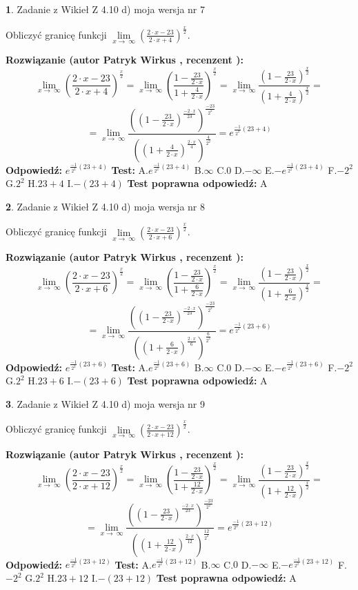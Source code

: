 \documentclass[12pt, a4paper]{article}
\theoremstyle{definition} %
\newtheorem{zad}{}
\newcommand{\zadStart}[1]{\begin{zad}#1\newline}
\newcommand{\zadStop}{\end{zad}}
\newcommand{\rozwStart}[2]{\noindent \textbf{Rozwiązanie (autor #1 , recenzent #2): }\newline}
\newcommand{\rozwStop}{\newline}
\newcommand{\odpStart}{\noindent \textbf{Odpowiedź:}\newline}
\newcommand{\odpStop}{\newline}
\newcommand{\testStart}{\noindent \textbf{Test:}\newline}
\newcommand{\testStop}{\newline}
\newcommand{\kluczStart}{\noindent \textbf{Test poprawna odpowiedź:}\newline}
\newcommand{\kluczStop}{\newline}
\begin{document}
\zadStart{Zadanie z Wikieł Z 4.10 d) moja wersja nr 7}


Obliczyć granicę funkcji  $\lim\limits_{x\to\ \infty}(\frac{2\cdot x-23}{2\cdot x+4})^{\frac{x}{2}}$.
\zadStop
\rozwStart{Patryk Wirkus}{}
$$\lim\limits_{x\to\ \infty}(\frac{2\cdot x-23}{2\cdot x+4})^{\frac{x}{2}} = \lim\limits_{x\to\ \infty}(\frac{1-\frac{23}{2\cdot x}}{1+\frac{4}{2\cdot x}})^{\frac{x}{2}}=\lim\limits_{x\to\ \infty}\frac{(1-\frac{23}{2\cdot x})^{\frac{x}{2}}}{(1+\frac{4}{2\cdot x})^{\frac{x}{2}}}=$$
$$=\lim\limits_{x\to\ \infty}\frac{((1-\frac{23}{2\cdot x})^{\frac{-2\cdot x}{23}})^{\frac{-23}{2^{2}}}}{((1+\frac{4}{2\cdot x})^{\frac{2\cdot x}{4}})^{\frac{4}{2^{2}}}}=e^{\frac{-1}{2^{2}}(23+4)}$$
\rozwStop
\odpStart
$e^{\frac{-1}{2^{2}}(23+4)}$
\odpStop
\testStart
A.$e^{\frac{-1}{2^{2}}(23+4)}$ B.$\infty$ C.$0$ D.$-\infty$ E.$-e^{\frac{-1}{2^{2}}(23+4)}$
F.$-2^{2}$ G.$2^{2}$
H.$23+4$
I.$-(23+4)$
\testStop
\kluczStart
A
\kluczStop



\zadStart{Zadanie z Wikieł Z 4.10 d) moja wersja nr 8}


Obliczyć granicę funkcji  $\lim\limits_{x\to\ \infty}(\frac{2\cdot x-23}{2\cdot x+6})^{\frac{x}{2}}$.
\zadStop
\rozwStart{Patryk Wirkus}{}
$$\lim\limits_{x\to\ \infty}(\frac{2\cdot x-23}{2\cdot x+6})^{\frac{x}{2}} = \lim\limits_{x\to\ \infty}(\frac{1-\frac{23}{2\cdot x}}{1+\frac{6}{2\cdot x}})^{\frac{x}{2}}=\lim\limits_{x\to\ \infty}\frac{(1-\frac{23}{2\cdot x})^{\frac{x}{2}}}{(1+\frac{6}{2\cdot x})^{\frac{x}{2}}}=$$
$$=\lim\limits_{x\to\ \infty}\frac{((1-\frac{23}{2\cdot x})^{\frac{-2\cdot x}{23}})^{\frac{-23}{2^{2}}}}{((1+\frac{6}{2\cdot x})^{\frac{2\cdot x}{6}})^{\frac{6}{2^{2}}}}=e^{\frac{-1}{2^{2}}(23+6)}$$
\rozwStop
\odpStart
$e^{\frac{-1}{2^{2}}(23+6)}$
\odpStop
\testStart
A.$e^{\frac{-1}{2^{2}}(23+6)}$ B.$\infty$ C.$0$ D.$-\infty$ E.$-e^{\frac{-1}{2^{2}}(23+6)}$
F.$-2^{2}$ G.$2^{2}$
H.$23+6$
I.$-(23+6)$
\testStop
\kluczStart
A
\kluczStop



\zadStart{Zadanie z Wikieł Z 4.10 d) moja wersja nr 9}


Obliczyć granicę funkcji  $\lim\limits_{x\to\ \infty}(\frac{2\cdot x-23}{2\cdot x+12})^{\frac{x}{2}}$.
\zadStop
\rozwStart{Patryk Wirkus}{}
$$\lim\limits_{x\to\ \infty}(\frac{2\cdot x-23}{2\cdot x+12})^{\frac{x}{2}} = \lim\limits_{x\to\ \infty}(\frac{1-\frac{23}{2\cdot x}}{1+\frac{12}{2\cdot x}})^{\frac{x}{2}}=\lim\limits_{x\to\ \infty}\frac{(1-\frac{23}{2\cdot x})^{\frac{x}{2}}}{(1+\frac{12}{2\cdot x})^{\frac{x}{2}}}=$$
$$=\lim\limits_{x\to\ \infty}\frac{((1-\frac{23}{2\cdot x})^{\frac{-2\cdot x}{23}})^{\frac{-23}{2^{2}}}}{((1+\frac{12}{2\cdot x})^{\frac{2\cdot x}{12}})^{\frac{12}{2^{2}}}}=e^{\frac{-1}{2^{2}}(23+12)}$$
\rozwStop
\odpStart
$e^{\frac{-1}{2^{2}}(23+12)}$
\odpStop
\testStart
A.$e^{\frac{-1}{2^{2}}(23+12)}$ B.$\infty$ C.$0$ D.$-\infty$ E.$-e^{\frac{-1}{2^{2}}(23+12)}$
F.$-2^{2}$ G.$2^{2}$
H.$23+12$
I.$-(23+12)$
\testStop
\kluczStart
A
\kluczStop
\end{document}
